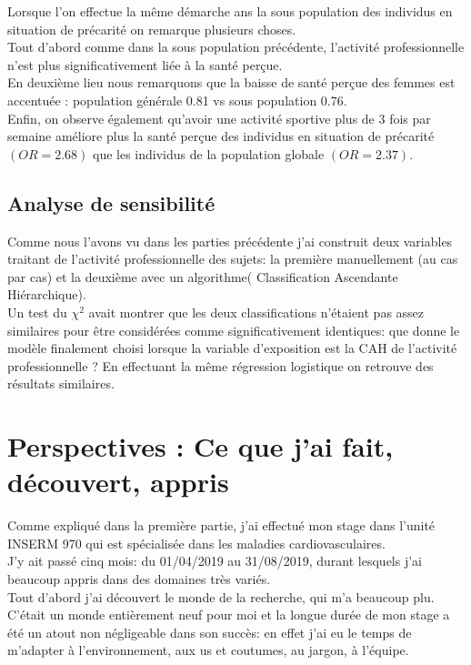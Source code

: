 \documentclass{book}
\begin{document}
\bigskip

\noindent
Lorsque l'on effectue la même démarche ans la sous population des individus en situation de précarité on remarque plusieurs choses.\\
\linebreak
\noindent
Tout d'abord comme dans la sous population précédente, l'activité professionnelle n'est plus significativement liée à la santé perçue.\\

\noindent
En deuxième lieu nous remarquons que la baisse de santé perçue des femmes est accentuée : population générale 0.81 vs sous population 0.76.\\

\noindent
Enfin, on observe également qu'avoir une activité sportive plus de 3 fois par semaine améliore plus la santé perçue des individus en situation de précarité $(OR = 2.68)$ que les individus de la population globale $(OR = 2.37)$.\\
\subsection{Analyse de sensibilité}
Comme nous l'avons vu dans les parties précédente j'ai construit deux variables traitant de l'activité professionnelle des sujets: la première manuellement (au cas par cas) et la deuxième avec un algorithme( Classification Ascendante Hiérarchique).\\
Un test du $\chi ^2$ avait montrer que les deux classifications n'étaient pas assez similaires pour être considérées comme significativement identiques: que donne le modèle finalement choisi lorsque la variable d'exposition est la CAH de l'activité professionnelle ?
En effectuant la même régression logistique on retrouve des résultats similaires.\\

\newpage
\section{Perspectives : Ce que j'ai fait, découvert, appris}

\noindent
Comme expliqué dans la première partie, j'ai effectué mon stage dans l'unité INSERM 970 qui est spécialisée dans les maladies cardiovasculaires.\\
J'y ait passé cinq mois: du 01/04/2019 au 31/08/2019, durant lesquels j'ai beaucoup appris dans des domaines très variés.\\
Tout d'abord j'ai découvert le monde de la recherche, qui m'a beaucoup plu. C'était un monde entièrement neuf pour moi et la longue durée de mon stage a été un atout non négligeable dans son succès: en effet j'ai eu le temps de m'adapter à l'environnement, aux us et coutumes, au jargon, à l'équipe.\\
\end{document}
